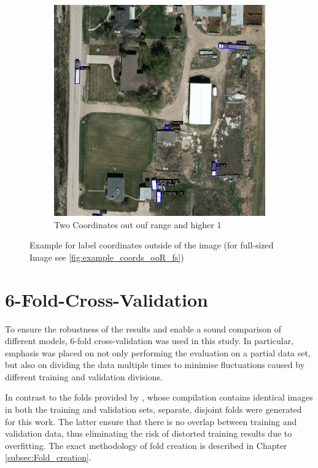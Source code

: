 \begin{figure}[h]
\begin{subfigure}[b]{0.45\textwidth}
        \includegraphics[trim={180pt 0pt 750pt 993pt},clip,width=\textwidth]{images/bb_higher1.png}
        \caption{Two Coordinates out ouf range and higher 1}
        \label{fig:higher1}
    \end{subfigure}
    \caption[Example for label coordinates outside of the image]{Example for label coordinates outside of the image (for full-sized Image see \ref{fig:example_coords_ooR_fs})}
    \label{fig:example_coords_ooR}
\end{figure}







\section{6-Fold-Cross-Validation}
\label{sec_5Fold_CV}


To ensure the robustness of the results and enable a sound comparison of different models, 6-fold cross-validation was used in this study. In particular, emphasis was placed on not only performing the evaluation on a partial data set, but also on dividing the data multiple times to minimise fluctuations caused by different training and validation divisions.

In contrast to the folds provided by \citeauthor{Razakarivony2015} \cite{Razakarivony2015}, whose compilation contains identical images in both the training and validation sets, separate, disjoint folds were generated for this work. The latter ensure that there is no overlap between training and validation data, thus eliminating the risk of distorted training results due to overfitting. The exact methodology of fold creation is described in Chapter \ref{subsec:Fold_creation}.

